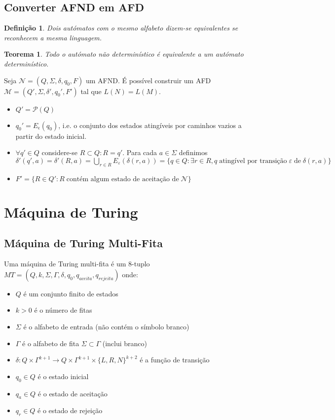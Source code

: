 \documentclass[10pt,a4paper]{report}
\newtheorem{definition}{Definição}
\newtheorem{theorem}{Teorema}
\begin{document}
\subsection{Converter AFND em AFD}
\begin{definition}
Dois autómatos com o mesmo alfabeto dizem-se equivalentes se reconhecem a mesma linguagem.
\end{definition}
\begin{theorem}
Todo o autómato não determinístico é equivalente a um autómato determinístico.
\end{theorem}
Seja $\mathcal{N}=(Q,\Sigma,\delta,q_0,F)$ um AFND. É possível construir um AFD $\mathcal{M}=(Q',\Sigma,\delta',q_0',F')$ tal que $L(N)=L(M)$.
\begin{itemize}
\item $Q' = \mathcal{P}(Q)$
\item $q_0' = E_\epsilon(q_0)$, i.e. o conjunto dos estados atingíveis por caminhos vazios a partir do estado inicial.
\item $\forall q' \in Q$ considere-se $R\subset Q:R = q'$. Para cada $a \in \Sigma$ definimos $\delta'(q',a) = \delta'(R,a) = \bigcup_{r\in R} E_\varepsilon(\delta(r,a)) = \{q\in Q: \exists r \in R,q \; \text{atingível por transição} \; \varepsilon \; \text{de} \; \delta(r,a)\}$
\item $F' = \{R\in Q':R \; \text{contém algum estado de aceitação de} \; \mathcal{N}\}$
\end{itemize}

\section{Máquina de Turing}
\subsection{Máquina de Turing Multi-Fita}
Uma máquina de Turing multi-fita é um 8-tuplo $MT = (Q, k, \Sigma, \Gamma, \delta, q_0, q_{aceita}, q_{rejeita})$ onde:
\begin{itemize}
\item $Q$ é um conjunto finito de estados
\item $k > 0$ é o número de fitas
\item $\Sigma$ é o alfabeto de entrada (não contém o símbolo branco)
\item $\Gamma$ é o alfabeto de fita $\Sigma \subset \Gamma$ (inclui branco)
\item $\delta: Q \times \Gamma^{k+1} \rightarrow Q \times \Gamma^{k+1} \times \{L,R,N\}^{k+2}$  é a função de transição
\item $q_0 \in Q$ é o estado inicial
\item $q_a \in Q$ é o estado de aceitação
\item $q_r \in Q$ é o estado de rejeição
\end{itemize}
\end{document}
